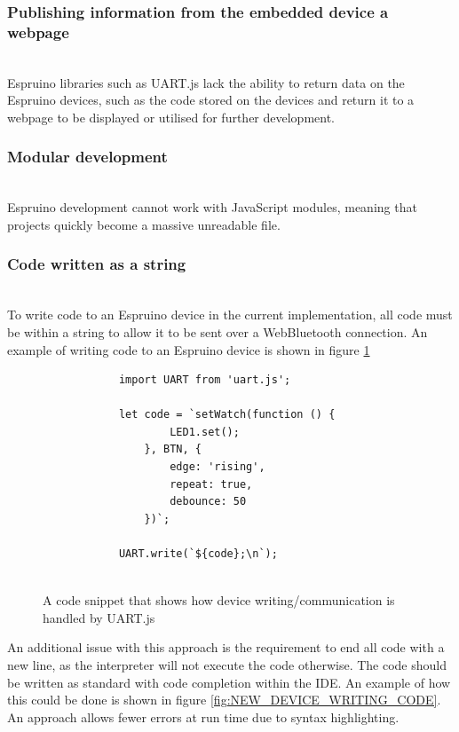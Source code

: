 \documentclass{l4proj}
\begin{document}
\subsubsection{Publishing information from the embedded device a webpage}\hfill\\
Espruino libraries such as UART.js lack the ability to return data on the Espruino devices, such as the code stored on the devices and return it to a webpage to be displayed or utilised for further development.

\subsubsection{Modular development}\hfill\\
Espruino development cannot work with JavaScript modules, meaning that  projects quickly become a massive unreadable file. 

\subsubsection{Code written as a string}\hfill\\
To write code to an Espruino device in the current implementation, all code must be within a string to allow it to be sent over a WebBluetooth connection. An example of writing code to an Espruino device is shown in figure \ref{fig:OLD_UART_DEVICE_WRITING_CODE}
    \begin{figure}[H]
    \centering
    \begin{minipage}{8cm}
        
    
        \begin{lstlisting}
            import UART from 'uart.js';
        
            let code = `setWatch(function () {
                    LED1.set();
                }, BTN, {
                    edge: 'rising',
                    repeat: true,
                    debounce: 50
                })`;

            UART.write(`${code};\n`);
            
        \end{lstlisting}
        \end{minipage}
        \caption{A code snippet that shows how device writing/communication is handled by UART.js}
        \label{fig:OLD_UART_DEVICE_WRITING_CODE}
    \end{figure}

     An additional issue with this approach is the requirement to end all code with a new line, as the interpreter will not execute the code otherwise. The code should be written as standard with code completion within the IDE. An example of how this could be done is shown in figure \ref{fig:NEW_DEVICE_WRITING_CODE}. An approach allows fewer errors at run time due to syntax highlighting. 
\end{document}
